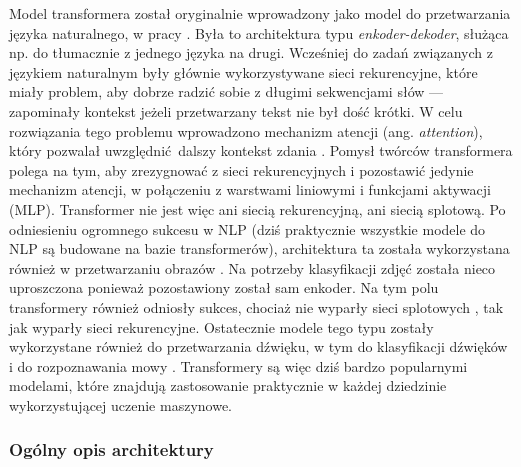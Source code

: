 Model transformera został oryginalnie wprowadzony jako model do przetwarzania języka naturalnego, w
pracy \cite{vaswani_attention_2017}. Była to architektura typu \emph{enkoder-dekoder}, służąca np.
do tłumacznie z jednego języka na drugi. Wcześniej do zadań związanych z językiem naturalnym były
głównie wykorzystywane sieci rekurencyjne, które miały problem, aby dobrze radzić sobie z długimi
sekwencjami słów --- zapominały kontekst jeżeli przetwarzany tekst nie był dość krótki. W celu
rozwiązania tego problemu wprowadzono mechanizm atencji (ang. \emph{attention}), który pozwalał
uwzględnić dalszy kontekst zdania \cite{bahdanau_neural_2016}. Pomysł twórców transformera polega na
tym, aby zrezygnować z sieci rekurencyjnych i pozostawić jedynie mechanizm atencji, w połączeniu z
warstwami liniowymi i funkcjami aktywacji (MLP). Transformer nie jest więc ani siecią rekurencyjną,
ani siecią splotową. Po odniesieniu ogromnego sukcesu w NLP (dziś praktycznie wszystkie modele do
NLP są budowane na bazie transformerów), architektura ta została wykorzystana również w
przetwarzaniu obrazów \cite{dosovitskiy_image_2021}. Na potrzeby klasyfikacji zdjęć została nieco
uproszczona ponieważ pozostawiony został sam enkoder. Na tym polu transformery również odniosły
sukces, chociaż nie wyparły sieci splotowych \cite{liu_convnet_2022}, tak jak wyparły sieci
rekurencyjne. Ostatecznie modele tego typu zostały wykorzystane również do przetwarzania dźwięku, w
tym do klasyfikacji dźwięków \cite{gong_ast_2021} i do rozpoznawania mowy
\cite{kim_squeezeformer_2022}. Transformery są więc dziś bardzo popularnymi modelami, które znajdują
zastosowanie praktycznie w każdej dziedzinie wykorzystującej uczenie maszynowe.

\subsubsection{Ogólny opis architektury}

